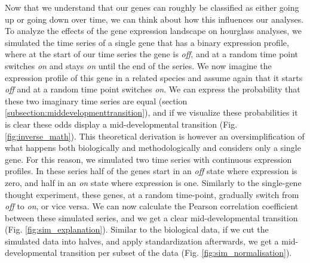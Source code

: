 Now that we understand that our genes can roughly be classified as either going up or going down over time, we can think about how this influences our analyses. To analyze the effects of the gene expression landscape on hourglass analyses, we simulated the time series of a single gene that has a binary expression profile, where at the start of our time series the gene is \textit{off}, and at a random time point switches \textit{on} and stays \textit{on} until the end of the series. We now imagine the expression profile of this gene in a related species and assume again that it starts \textit{off} and at a random time point switches \textit{on}. We can express the probability that these two imaginary time series are equal (section \ref{subsection:middevelopmenttransition}), and if we visualize these probabilities it is clear these odds display a mid-developmental transition (Fig. \ref{fig:inverse_math}). This theoretical derivation is however an oversimplification of what happens both biologically and methodologically and considers only a single gene. For this reason, we simulated two time series with continuous expression profiles. In these series half of the genes start in an \textit{off} state where expression is zero, and half in an \textit{on} state where expression is one. Similarly to the single-gene thought experiment, these genes, at a random time-point, gradually switch from \textit{off} to \textit{on}, or vice versa. We can now calculate the Pearson correlation coefficient between these simulated series, and we get a clear mid-developmental transition (Fig. \ref{fig:sim_explanation}). Similar to the biological data, if we cut the simulated data into halves, and apply standardization afterwards, we get a mid-developmental transition per subset of the data (Fig. \ref{fig:sim_normalisation}). 

